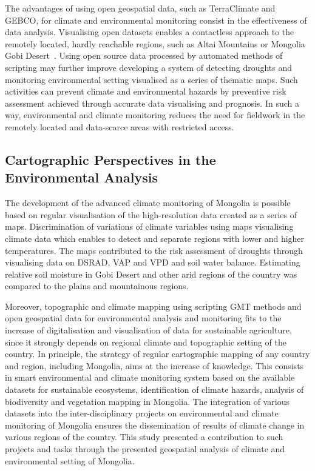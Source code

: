 \documentclass[geosciences,article,accept,pdftex,oneauthor]{Definitions/mdpi}
\begin{document}
The advantages of using open geospatial data, such as TerraClimate and GEBCO, for climate and environmental monitoring consist in the effectiveness of data analysis. Visualising open datasets enables a contactless approach to the remotely located, hardly reachable regions, such as Altai Mountains or Mongolia Gobi Desert~\cite{HEINER202078}. Using open source data processed by automated methods of scripting may further improve developing a system of detecting droughts and monitoring environmental setting visualised as a series of thematic maps. Such activities can prevent climate and environmental hazards by preventive risk assessment achieved through accurate data visualising and prognosis. In such a way, environmental and climate monitoring reduces the need for fieldwork in the remotely located and data-scarce areas with restricted access.

\subsection{Cartographic Perspectives in the Environmental Analysis}
The development of the advanced climate monitoring of Mongolia is possible based on regular visualisation of the high-resolution data created as a series of maps. Discrimination of variations of climate variables using maps visualising climate data which enables to detect and separate regions with lower and higher temperatures. The maps contributed to the risk assessment of droughts through visualising data on DSRAD, VAP and VPD and soil water balance. Estimating relative soil moisture in Gobi Desert and other arid regions of the country was compared to the plains and mountainous regions. 

Moreover, topographic and climate mapping using scripting GMT methods and open geospatial data for environmental analysis and monitoring fits to the increase of digitalisation and visualisation of data for sustainable agriculture, since it strongly depends on regional climate and topographic setting of the country. In principle, the strategy of regular cartographic mapping of any country and region, including Mongolia, aims at the increase of knowledge. This consists in smart environmental and climate monitoring system based on the available datasets for sustainable ecosystems, identification of climate hazards, analysis of biodiversity and vegetation mapping in Mongolia. The integration of various datasets into the inter-disciplinary projects on environmental and climate monitoring of Mongolia ensures the dissemination of results of climate change in various regions of the country. This study presented a contribution to such projects and tasks through the presented geospatial analysis of climate and environmental setting of Mongolia.
\end{document}
